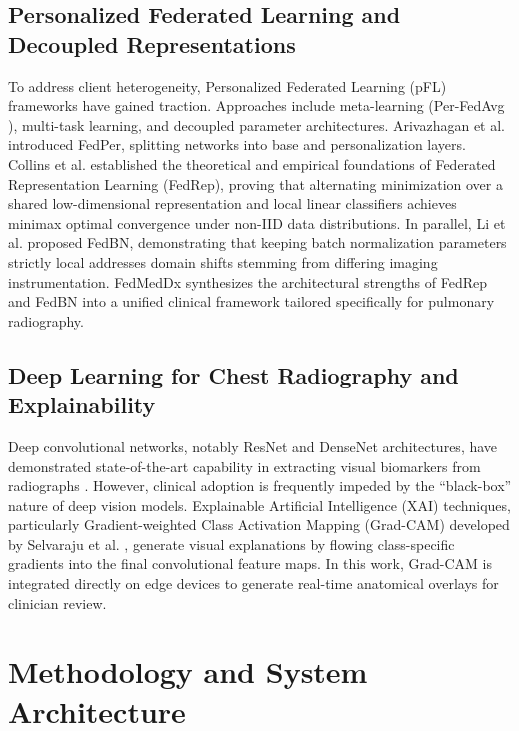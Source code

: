 \documentclass[conference]{IEEEtran}
\begin{document}
\subsection{Personalized Federated Learning and Decoupled Representations}
To address client heterogeneity, Personalized Federated Learning (pFL) frameworks have gained traction. Approaches include meta-learning (Per-FedAvg \cite{fallah2020personalized}), multi-task learning, and decoupled parameter architectures. Arivazhagan et al. \cite{arivazhagan2019federated} introduced FedPer, splitting networks into base and personalization layers. Collins et al. \cite{collins2021exploiting} established the theoretical and empirical foundations of Federated Representation Learning (FedRep), proving that alternating minimization over a shared low-dimensional representation and local linear classifiers achieves minimax optimal convergence under non-IID data distributions. In parallel, Li et al. \cite{li2021fedbn} proposed FedBN, demonstrating that keeping batch normalization parameters strictly local addresses domain shifts stemming from differing imaging instrumentation. FedMedDx synthesizes the architectural strengths of FedRep and FedBN into a unified clinical framework tailored specifically for pulmonary radiography.

\subsection{Deep Learning for Chest Radiography and Explainability}
Deep convolutional networks, notably ResNet \cite{he2016deep} and DenseNet architectures, have demonstrated state-of-the-art capability in extracting visual biomarkers from radiographs \cite{rajpurkar2017chexnet, wang2017chestx}. However, clinical adoption is frequently impeded by the ``black-box'' nature of deep vision models. Explainable Artificial Intelligence (XAI) techniques, particularly Gradient-weighted Class Activation Mapping (Grad-CAM) developed by Selvaraju et al. \cite{selvaraju2017grad}, generate visual explanations by flowing class-specific gradients into the final convolutional feature maps. In this work, Grad-CAM is integrated directly on edge devices to generate real-time anatomical overlays for clinician review.

\section{Methodology and System Architecture}
\end{document}
